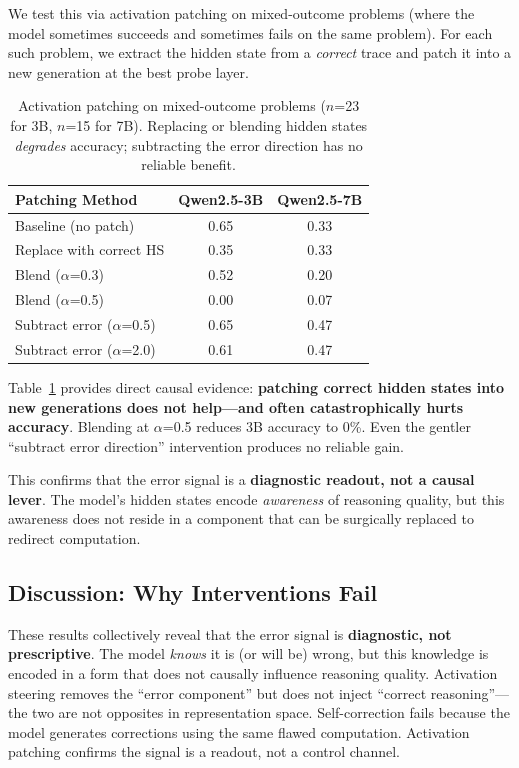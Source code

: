 \documentclass[11pt]{article}
\newcommand{\modelsmall}{Qwen2.5-3B}
\newcommand{\modelmed}{Qwen2.5-7B}
\begin{document}
We test this via activation patching \cite{meng2022locating,vig2020investigating} on mixed-outcome problems (where the model sometimes succeeds and sometimes fails on the same problem).
For each such problem, we extract the hidden state from a \textit{correct} trace and patch it into a new generation at the best probe layer.

\begin{table}[t]
\centering
\small
\begin{tabular}{lcc}
\toprule
\textbf{Patching Method} & \textbf{\modelsmall} & \textbf{\modelmed} \\
\midrule
Baseline (no patch) & 0.65 & 0.33 \\
Replace with correct HS & 0.35 & 0.33 \\
Blend ($\alpha$=0.3) & 0.52 & 0.20 \\
Blend ($\alpha$=0.5) & 0.00 & 0.07 \\
Subtract error ($\alpha$=0.5) & 0.65 & 0.47 \\
Subtract error ($\alpha$=2.0) & 0.61 & 0.47 \\
\bottomrule
\end{tabular}
\caption{Activation patching on mixed-outcome problems ($n$=23 for 3B, $n$=15 for 7B). Replacing or blending hidden states \textit{degrades} accuracy; subtracting the error direction has no reliable benefit.}
\label{tab:patching}
\end{table}

Table~\ref{tab:patching} provides direct causal evidence: \textbf{patching correct hidden states into new generations does not help---and often catastrophically hurts accuracy}.
Blending at $\alpha$=0.5 reduces 3B accuracy to 0\%.
Even the gentler ``subtract error direction'' intervention produces no reliable gain.

This confirms that the error signal is a \textbf{diagnostic readout, not a causal lever}.
The model's hidden states encode \textit{awareness} of reasoning quality, but this awareness does not reside in a component that can be surgically replaced to redirect computation.

\subsection{Discussion: Why Interventions Fail}

These results collectively reveal that the error signal is \textbf{diagnostic, not prescriptive}.
The model \textit{knows} it is (or will be) wrong, but this knowledge is encoded in a form that does not causally influence reasoning quality.
Activation steering removes the ``error component'' but does not inject ``correct reasoning''---the two are not opposites in representation space.
Self-correction fails because the model generates corrections using the same flawed computation.
Activation patching confirms the signal is a readout, not a control channel.
\end{document}
